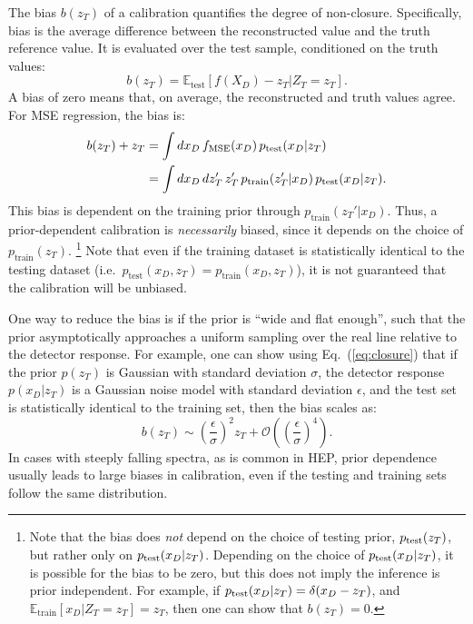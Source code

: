 \documentclass[aps,prd,reprint,preprintnumbers,superscriptaddress,nofootinbib,longbibliography,floatfix]{revtex4-1}
\DeclareRobustCommand{\Eq}[1]{Eq.~(\ref{eq:#1})}
\begin{document}
The bias $b(z_T)$ of a calibration quantifies the degree of non-closure.
%
Specifically, bias is the average difference between the reconstructed value and the truth reference value.
%
It is evaluated over the test sample, conditioned on the truth values:
%
\begin{equation}
b(z_T)=\mathbb{E}_{\text{test}}[f(X_D)-z_T|Z_T=z_T].\label{eq:bias}
\end{equation}
%
A bias of zero means that, on average, the reconstructed and truth values agree.
%
For MSE regression, the bias is:
%
\begin{align}
    b(z_T)+z_T&=\int dx_D\,f_{\rm MSE}(x_D)\, p_\text{test}(x_D|z_T) \label{eq:closure} \\
    &=\int dx_D\,dz_T'\,z_T'\,p_\text{train}(z_T'|x_D)\, p_\text{test}(x_D|z_T). \nonumber
\end{align}
%
This bias is dependent on the training prior through $p_\text{train}(z_T'|x_D)$.
%
Thus, a prior-dependent calibration is \emph{necessarily} biased, since it depends on the choice of $p_{\text{train}}(z_T)$.%
%
\footnote{Note that the bias does \textit{not} depend on the choice of testing prior, $p_{\rm test}(z_T)$, but rather only on $p_{\rm test}(x_D|z_T)$. Depending on the choice of $p_{\rm test}(x_D|z_T)$, it is possible for the bias to be zero, but this does not imply the inference is prior independent. For example, if $p_{\rm test}(x_D|z_T) = \delta(x_D-z_T)$, and $\mathbb{E}_{\text{train}}[x_D|Z_T=z_T] = z_T$, then one can show that $b(z_T) = 0$.}
%
Note that even if the training dataset is statistically identical to the testing dataset (i.e.\ $p_\text{test}(x_D, z_T) = p_\text{train}(x_D, z_T)$), it is not guaranteed that the calibration will be unbiased.




One way to reduce the bias is if the prior is ``wide and flat enough'', such that the prior asymptotically approaches a uniform sampling over the real line relative to the detector response. 
%
 For example, one can show using \Eq{closure} that if the prior $p(z_T)$ is Gaussian with standard deviation $\sigma$, the detector response $p(x_D|z_T)$ is a Gaussian noise model with standard deviation $\epsilon$, and the test set is statistically identical to the training set, then the bias scales as:
%
\begin{equation}
\label{eq:bias_scaling}
b(z_T) \sim \left(\frac{\epsilon}{\sigma}\right)^2 z_T + \mathcal{O}\left(\left(\frac{\epsilon}{\sigma}\right)^4\right).
\end{equation}
%
In cases with steeply falling spectra, as is common in HEP, prior dependence usually leads to large biases in calibration, even if the testing and training sets follow the same distribution.
\end{document}
